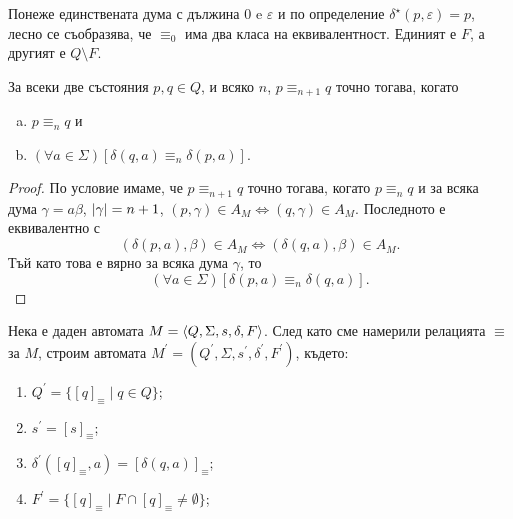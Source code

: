 Понеже единствената дума с дължина $0$ e $\varepsilon$ и по определение $\delta^\star(p,\varepsilon) = p$, 
лесно се съобразява, че $\equiv_0$ има два класа на еквивалентност.
Единият е $F$, а другият е $Q\setminus F$.

\begin{prop}
  За всеки две състояния $p,q \in Q$, и всяко $n$, $p \equiv_{n+1} q$ точно тогава, когато
  \begin{enumerate}[a)]
  \item
    $p \equiv_{n} q$ и
  \item
    $(\forall a \in \Sigma)[\delta(q,a) \equiv_{n} \delta(p,a)]$.
  \end{enumerate}
\end{prop}
\begin{proof}%
  По условие имаме, че $p\equiv_{n+1} q$ точно тогава, когато
  $p\equiv_n q$ и за всяка дума $\gamma = a\beta$, $\vert{\gamma}\vert = n+1$,
  $(p,\gamma) \in A_M \iff (q,\gamma)\in A_M$.
  Последното е еквивалентно с 
  \[(\delta(p,a),\beta) \in A_M \iff (\delta(q,a),\beta) \in A_M.\]
  Тъй като това е вярно за всяка дума $\gamma$, то
  \[(\forall a\in\Sigma)[\delta(p,a) \equiv_{n} \delta(q, a)].\]
  
\end{proof}

Нека е даден автомата $M = \langle{Q,\Sigma,s,\delta,F}\rangle$.
След като сме намерили релацията $\equiv$ за $M$, 
строим автомата $M^\prime = (Q^\prime,\Sigma,s^\prime,\delta^\prime,F^\prime)$, където:
\begin{enumerate}[1)]
\item
  $Q^\prime = \{[q]_\equiv \mid q\in Q\}$;
\item
  $s^\prime = [s]_\equiv$;
\item
  $\delta^\prime([q]_\equiv, a) = [\delta(q,a)]_\equiv$;
\item
  $F^\prime = \{[q]_\equiv\mid F\cap [q]_\equiv \neq \emptyset\}$;
\end{enumerate}


      
      
